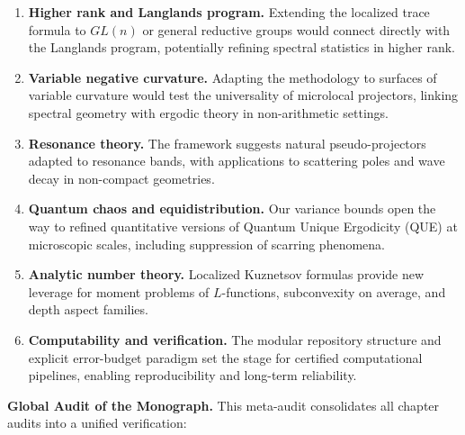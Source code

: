 \begin{enumerate}
  \item \textbf{Higher rank and Langlands program.}  
  Extending the localized trace formula to $GL(n)$ or general reductive groups would connect directly with the Langlands program, potentially refining spectral statistics in higher rank.

  \item \textbf{Variable negative curvature.}  
  Adapting the methodology to surfaces of variable curvature would test the universality of microlocal projectors, linking spectral geometry with ergodic theory in non-arithmetic settings.

  \item \textbf{Resonance theory.}  
  The framework suggests natural pseudo-projectors adapted to resonance bands, with applications to scattering poles and wave decay in non-compact geometries.

  \item \textbf{Quantum chaos and equidistribution.}  
  Our variance bounds open the way to refined quantitative versions of Quantum Unique Ergodicity (QUE) at microscopic scales, including suppression of scarring phenomena.

  \item \textbf{Analytic number theory.}  
  Localized Kuznetsov formulas provide new leverage for moment problems of $L$-functions, subconvexity on average, and depth aspect families.

  \item \textbf{Computability and verification.}  
  The modular repository structure and explicit error-budget paradigm set the stage for certified computational pipelines, enabling reproducibility and long-term reliability.
\end{enumerate}

\medskip

\noindent\textbf{Global Audit of the Monograph.}
This meta-audit consolidates all chapter audits into a unified verification:

